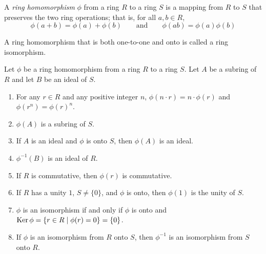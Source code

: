 \begin{definition}
	A \textit{ring homomorphism} $\phi$ from a ring $R$ to a ring $S$ is a mapping from $R$ to $S$ that preserves the two ring operations; that is, for all $a,b\in R$, 
	$$
	\phi(a+b) = \phi(a) + \phi(b) \qquad \text{and} \qquad \phi(ab) = \phi(a)\phi(b)
	$$
\end{definition}

\begin{definition}[Isomorphism]
	A ring homomorphism that is both one-to-one and onto is called a ring isomorphism.
\end{definition}

\begin{proposition}
	Let $\phi$ be a ring homomorphism from a ring $R$ to a ring $S$. Let $A$ be a subring of $R$ and let $B$ be an ideal of $S$.
	\begin{enumerate}
		\item For any $r\in R$ and any positive integer $n$, $\phi(n\cdot r) = n\cdot\phi(r)$ and $\phi(r^n) = \phi(r)^n$.
		\item $\phi(A)$ is a subring of $S$.
		\item If $A$ is an ideal and $\phi$ is onto $S$, then $\phi(A)$ is an ideal.
		\item $\phi^{-1}(B)$ is an ideal of $R$.
		\item If $R$ is commutative, then $\phi(r)$ is commutative.
		\item If $R$ has a unity $1$, $S\ne\{0\}$, and $\phi$ is onto, then $\phi(1)$ is the unity of $S$.
		\item $\phi$ is an isomorphism if and only if $\phi$ is onto and $\operatorname{Ker}\phi=\{r\in R\mid \phi(r)=0\}=\{0\}$.
		\item If $\phi$ is an isomorphism from $R$ onto $S$, then $\phi^{-1}$ is an isomorphism from $S$ onto $R$.
	\end{enumerate}
\end{proposition}
